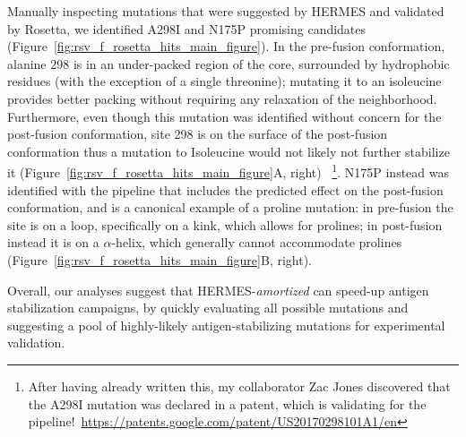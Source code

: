 {Manually inspecting mutations that were suggested by HERMES and validated by Rosetta, we identified A298I and N175P
promising candidates (Figure~\ref{fig:rsv_f_rosetta_hits_main_figure}).
In the pre-fusion conformation, alanine 298 is in an under-packed region of the core, surrounded by hydrophobic residues
(with the exception of a single threonine); mutating it to an isoleucine provides better packing without requiring any
relaxation of the neighborhood. Furthermore, even though this mutation
was identified without concern for the post-fusion conformation, site 298 is on the surface of the post-fusion conformation
thus a mutation to Isoleucine would not likely not further stabilize it (Figure~\ref{fig:rsv_f_rosetta_hits_main_figure}A, right)
~\footnote{After having already written this, my collaborator Zac Jones discovered that the A298I mutation was
declared in a patent, which is validating for the pipeline!~\url{https://patents.google.com/patent/US20170298101A1/en}}.
N175P instead was identified with the pipeline that includes the predicted effect on the post-fusion conformation,
and is a canonical example of a proline mutation: in pre-fusion the site is on a loop, specifically on a
kink, which allows for prolines; in post-fusion instead it is on a $\alpha$-helix, which generally cannot
accommodate prolines (Figure~\ref{fig:rsv_f_rosetta_hits_main_figure}B, right).

Overall, our analyses suggest that HERMES-{\em amortized} can speed-up antigen stabilization campaigns,
by quickly evaluating all possible mutations and suggesting a pool of highly-likely antigen-stabilizing
mutations for experimental validation.
}

